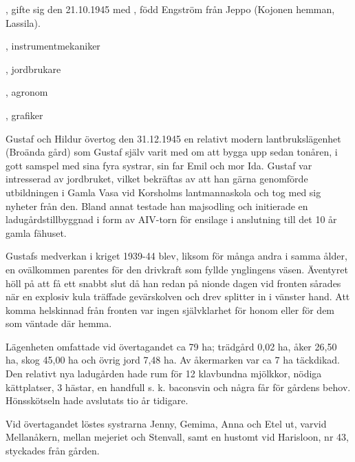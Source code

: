 
, gifte sig den 21.10.1945 med , född Engström från Jeppo (Kojonen hemman, Lassila).


\begin{jhchildren}
  \item {}, instrumentmekaniker
  \item {}, jordbrukare
  \item {}, agronom
  \item {}, grafiker
\end{jhchildren}

Gustaf och Hildur övertog den 31.12.1945 en relativt modern lantbrukslägenhet (Broända gård) som Gustaf själv varit med om att bygga upp sedan tonåren, i gott samspel med sina fyra systrar, sin far Emil och mor Ida. Gustaf var intresserad av jordbruket, vilket bekräftas av att han gärna genomförde utbildningen i Gamla Vasa vid Korsholms lantmannaskola och tog med sig nyheter från den. Bland annat testade han majsodling och initierade en ladugårdstillbyggnad i form av AIV-torn för ensilage i anslutning till det 10 år gamla fähuset.

Gustafs medverkan i kriget 1939-44 blev, liksom för många andra i samma ålder, en ovälkommen parentes för den drivkraft som fyllde ynglingens väsen. Äventyret höll på att få ett snabbt slut då han redan på nionde dagen vid fronten sårades när en explosiv kula träffade gevärskolven och drev splitter in i vänster hand. Att komma helskinnad från fronten var ingen självklarhet för honom eller för dem som väntade där hemma.

Lägenheten omfattade vid övertagandet ca 79 ha; trädgård 0,02 ha, åker 26,50 ha, skog 45,00 ha och övrig jord 7,48 ha. Av åkermarken var ca 7 ha täckdikad. Den relativt nya ladugården hade rum för 12 klavbundna mjölkkor, nödiga kättplatser, 3 hästar, en handfull s. k. baconsvin och några får för gårdens behov. Hönsskötseln hade avslutats tio år tidigare.

Vid övertagandet löstes systrarna Jenny, Gemima, Anna och Etel ut, varvid Mellanåkern, mellan mejeriet och Stenvall, samt en hustomt vid Harisloon, nr 43, styckades från gården.

